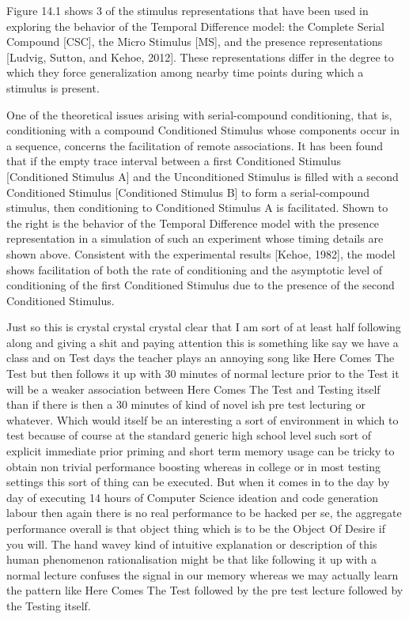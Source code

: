 Figure 14.1 shows 3 of the stimulus representations that have been used in exploring the behavior of the Temporal Difference model: the Complete Serial Compound [CSC], the Micro Stimulus [MS], and the presence representations [Ludvig, Sutton, and Kehoe, 2012]. These representations differ in the degree to which they force generalization among nearby time points during which a stimulus is present.

One of the theoretical issues arising with serial-compound conditioning, that is, conditioning with a compound Conditioned Stimulus whose components occur in a sequence, concerns the facilitation of remote associations. It has been found that if the empty trace interval between a first Conditioned Stimulus [Conditioned Stimulus A] and the Unconditioned Stimulus is filled with a second Conditioned Stimulus [Conditioned Stimulus B] to form a serial-compound stimulus, then conditioning to Conditioned Stimulus A is facilitated. Shown to the right is the behavior of the Temporal Difference model with the presence representation in a simulation of such an experiment whose timing details are shown above. Consistent with the experimental results [Kehoe, 1982], the model shows facilitation of both the rate of conditioning and the asymptotic level of conditioning of the first Conditioned Stimulus due to the presence of the second Conditioned Stimulus.

Just so this is crystal crystal crystal clear that I am sort of at least half following along and giving a shit and paying attention this is something like say we have a class and on Test days the teacher plays an annoying song like Here Comes The Test but then follows it up with 30 minutes of normal lecture prior to the Test it will be a weaker association between Here Comes The Test and Testing itself than if there is then a 30 minutes of kind of novel ish pre test lecturing or whatever. Which would itself be an interesting a sort of environment in which to test because of course at the standard generic high school level such sort of explicit immediate prior priming and short term memory usage can be tricky to obtain non trivial performance boosting whereas in college or in most testing settings this sort of thing can be executed. But when it comes in to the day by day of executing 14 hours of Computer Science ideation and code generation labour then again there is no real performance to be hacked per se, the aggregate performance overall is that object thing which is to be the Object Of Desire if you will. The hand wavey kind of intuitive explanation or description of this human phenomenon rationalisation might be that like following it up with a normal lecture confuses the signal in our memory whereas we may actually learn the pattern like Here Comes The Test followed by the pre test lecture followed by the Testing itself.

